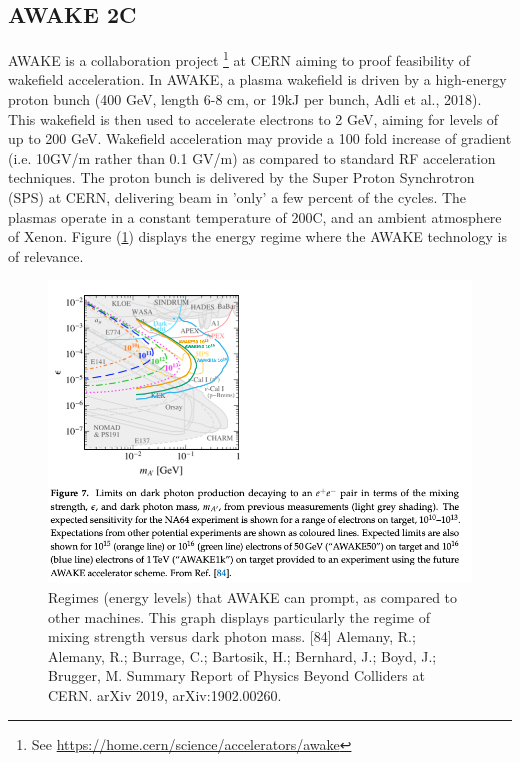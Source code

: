 \documentclass[12pt]{amsart}
\begin{document}
\subsection{AWAKE 2C}

AWAKE is a collaboration project \footnote{ See \url{https://home.cern/science/accelerators/awake}} at CERN
aiming to proof feasibility of wakefield acceleration.
In AWAKE, a plasma wakefield is driven by a high-energy proton bunch (400 GeV, length 6-8 cm, or 19kJ per bunch, Adli et al., 2018).
This wakefield is then used to accelerate electrons to 2 GeV, aiming for levels of up to 200 GeV. 
Wakefield acceleration may provide a 100 fold increase of gradient (i.e. 10GV/m rather than 0.1 GV/m) as compared to standard RF acceleration techniques.
The proton bunch is delivered by the Super Proton Synchrotron (SPS) at CERN, delivering beam in 'only' a few percent of the cycles.
The plasmas operate in a constant temperature of 200C, and an ambient atmosphere of Xenon.
Figure (\ref{fig:regime}) displays the energy regime where the AWAKE technology is of relevance.
\begin{figure}[htbp] %
   \centering
   \includegraphics[width=5in]{im/awake_regime.png} 
	\caption{Regimes (energy levels) that AWAKE can prompt, as compared to other machines.
	This graph displays particularly the regime of mixing strength versus dark photon mass.
	[84] Alemany, R.; Alemany, R.; Burrage, C.; Bartosik, H.; Bernhard, J.; Boyd, J.; Brugger, M. 
	Summary Report of Physics Beyond Colliders at CERN. arXiv 2019, arXiv:1902.00260.}
   \label{fig:regime}
\end{figure}
\end{document}
